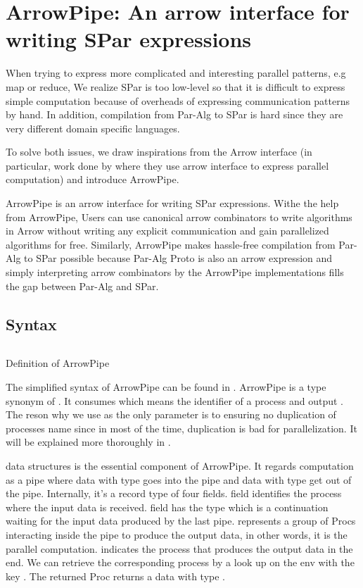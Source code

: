 \chapter{ArrowPipe: An arrow interface for writing SPar expressions}
When trying to express more complicated and interesting parallel patterns, e.g map or reduce, We realize SPar is too low-level so that it is difficult to express simple computation because of overheads of expressing communication patterns by hand. In addition, compilation from Par-Alg to SPar is hard since they are very different domain specific languages. 

To solve both issues, we draw inspirations from the Arrow interface (in particular, work done by \cite{braunArrowsParallelComputation2018} where they use arrow interface to express parallel computation) and introduce ArrowPipe.

ArrowPipe is an arrow interface for writing SPar expressions. Withe the help from ArrowPipe, Users can use canonical arrow combinators to write algorithms in Arrow without writing any explicit communication and gain parallelized algorithms for free. Similarly, ArrowPipe makes hassle-free compilation from Par-Alg to SPar possible because Par-Alg Proto is also an arrow expression and simply interpreting arrow combinators by the ArrowPipe implementations fills the gap between Par-Alg and SPar. 

\section{Syntax}
\begin{listing}[ht]
\inputminted{Haskell}{arrow/def.hs}
\caption{Definition of ArrowPipe}
\label{arrowPipe:def}
\end{listing}
The simplified syntax of ArrowPipe can be found in . ArrowPipe is a type synonym of . It consumes  which means the identifier of a process and output . The reson why we use  as the only parameter is to ensuring no duplication of processes name since in most of the time, duplication is bad for parallelization. It will be explained more thoroughly in .

 data structures is the essential component of ArrowPipe. It regards computation as a pipe where data with type  goes into the pipe and data with type  get out of the pipe. Internally, it's a record type of four fields.  field identifies the process where the input data is received.  field has the type  which is a continuation waiting for the input data produced by the last pipe.  represents a group of Procs interacting inside the pipe to produce the output data, in other words, it is the parallel computation.  indicates the process that produces the output data in the end. We can retrieve the corresponding process by a look up on the env with the key . The returned Proc returns a data with type .

